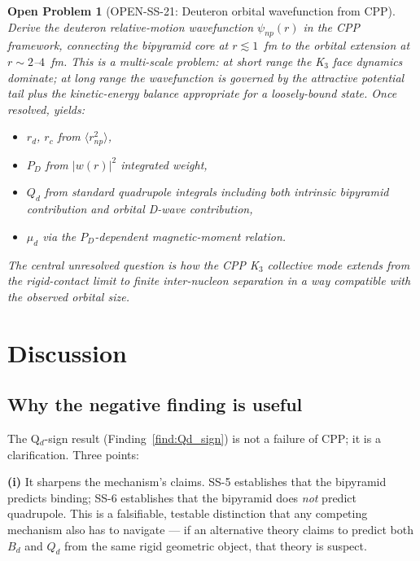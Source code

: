 \documentclass[11pt,letterpaper]{article}
\newtheorem{openproblem}{Open Problem}
\newcommand{\Bd}{B_{d}}
\newcommand{\Qd}{Q_{d}}
\newcommand{\PD}{P_{D}}
\newcommand{\mud}{\mu_{d}}
\begin{document}
\begin{openproblem}[OPEN-SS-21: Deuteron orbital wavefunction from CPP]
\label{open:orbital}
Derive the deuteron relative-motion wavefunction $\psi_{np}(r)$ in the CPP framework, connecting the bipyramid core at $r \lesssim 1$~fm to the orbital extension at $r \sim 2$--$4$~fm. This is a multi-scale problem: at short range the K$_3$ face dynamics dominate; at long range the wavefunction is governed by the attractive potential tail plus the kinetic-energy balance appropriate for a loosely-bound state. Once resolved, yields:
\begin{itemize}
\item $r_d$, $r_c$ from $\langle r_{np}^2 \rangle$,
\item $\PD$ from $|w(r)|^2$ integrated weight,
\item $\Qd$ from standard quadrupole integrals including both intrinsic bipyramid contribution and orbital D-wave contribution,
\item $\mud$ via the $\PD$-dependent magnetic-moment relation.
\end{itemize}
The central unresolved question is how the CPP K$_3$ collective mode extends from the rigid-contact limit to finite inter-nucleon separation in a way compatible with the observed orbital size.
\end{openproblem}

\section{Discussion}
\label{sec:discussion}

\subsection{Why the negative finding is useful}

The Q$_d$-sign result (Finding~\ref{find:Qd_sign}) is not a failure of CPP; it is a clarification. Three points:

\textbf{(i)} It sharpens the mechanism's claims. SS-5 establishes that the bipyramid predicts binding; SS-6 establishes that the bipyramid does \emph{not} predict quadrupole. This is a falsifiable, testable distinction that any competing mechanism also has to navigate --- if an alternative theory claims to predict both $\Bd$ and $\Qd$ from the same rigid geometric object, that theory is suspect.
\end{document}
